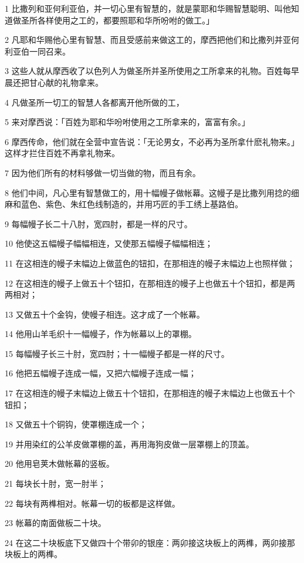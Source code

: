 \par 1 比撒列和亚何利亚伯，并一切心里有智慧的，就是蒙耶和华赐智慧聪明、叫他知道做圣所各样使用之工的，都要照耶和华所吩咐的做工。」
\par 2 凡耶和华赐他心里有智慧、而且受感前来做这工的，摩西把他们和比撒列并亚何利亚伯一同召来。
\par 3 这些人就从摩西收了以色列人为做圣所并圣所使用之工所拿来的礼物。百姓每早晨还把甘心献的礼物拿来。
\par 4 凡做圣所一切工的智慧人各都离开他所做的工，
\par 5 来对摩西说：「百姓为耶和华吩咐使用之工所拿来的，富富有余。」
\par 6 摩西传命，他们就在全营中宣告说：「无论男女，不必再为圣所拿什麽礼物来。」这样才拦住百姓不再拿礼物来。
\par 7 因为他们所有的材料够做一切当做的物，而且有余。
\par 8 他们中间，凡心里有智慧做工的，用十幅幔子做帐幕。这幔子是比撒列用捻的细麻和蓝色、紫色、朱红色线制造的，并用巧匠的手工绣上基路伯。
\par 9 每幅幔子长二十八肘，宽四肘，都是一样的尺寸。
\par 10 他使这五幅幔子幅幅相连，又使那五幅幔子幅幅相连；
\par 11 在这相连的幔子末幅边上做蓝色的钮扣，在那相连的幔子末幅边上也照样做；
\par 12 在这相连的幔子上做五十个钮扣，在那相连的幔子上也做五十个钮扣，都是两两相对；
\par 13 又做五十个金钩，使幔子相连。这才成了一个帐幕。
\par 14 他用山羊毛织十一幅幔子，作为帐幕以上的罩棚。
\par 15 每幅幔子长三十肘，宽四肘；十一幅幔子都是一样的尺寸。
\par 16 他把五幅幔子连成一幅，又把六幅幔子连成一幅；
\par 17 在这相连的幔子末幅边上做五十个钮扣，在那相连的幔子末幅边上也做五十个钮扣；
\par 18 又做五十个铜钩，使罩棚连成一个；
\par 19 并用染红的公羊皮做罩棚的盖，再用海狗皮做一层罩棚上的顶盖。
\par 20 他用皂荚木做帐幕的竖板。
\par 21 每块长十肘，宽一肘半；
\par 22 每块有两榫相对。帐幕一切的板都是这样做。
\par 23 帐幕的南面做板二十块。
\par 24 在这二十块板底下又做四十个带卯的银座：两卯接这块板上的两榫，两卯接那块板上的两榫。
